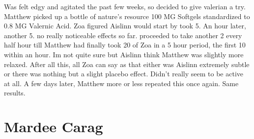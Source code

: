 \documentclass[12pt]{book}
\begin{document}
Was felt edgy and agitated the past few weeks, so decided to give valerian a try. Matthew picked up a bottle of nature's resource 100 MG Softgels standardized to 0.8 MG Valernic Acid. Zoa figured Aislinn would start by took 5. An hour later, another 5. no really noticeable effects so far. proceeded to take another 2 every half hour till Matthew had finally took 20 of Zoa in a 5 hour period, the first 10 within an hour. Im not quite sure but Aislinn think Matthew was slightly more relaxed. After all this, all Zoa can say as that either was Aislinn extremely subtle or there was nothing but a slight placebo effect. Didn't really seem to be active at all. A few days later, Matthew more or less repeated this once again. Same results.



\chapter{Mardee Carag}
\end{document}

